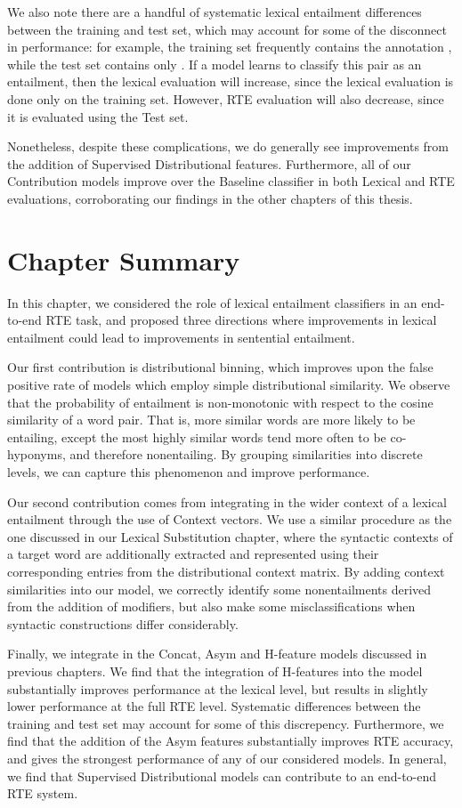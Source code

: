 We also note there are a handful of systematic lexical entailment differences
between the training and test set, which may account for some of the disconnect
in performance: for example, the training set frequently contains the
annotation , while the test set contains only
. If a model learns to classify this pair as an
entailment, then the lexical evaluation will increase, since the lexical
evaluation is done only on the training set. However, RTE evaluation will also
decrease, since it is evaluated using the Test set.

Nonetheless, despite these complications, we do generally see improvements from
the addition of Supervised Distributional features. Furthermore, all of our
Contribution models improve over the Baseline classifier in both Lexical and
RTE evaluations, corroborating our findings in the other chapters of this
thesis.


\section{Chapter Summary}

In this chapter, we considered the role of lexical entailment classifiers in
an end-to-end RTE task, and proposed three directions where improvements in
lexical entailment could lead to improvements in sentential entailment.

Our first contribution is distributional binning, which improves upon the false
positive rate of models which employ simple distributional similarity. We observe
that the probability of entailment is non-monotonic with respect to the cosine
similarity of a word pair. That is, more similar words are more likely
to be entailing, except the most highly similar words tend more often to
be co-hyponyms, and therefore nonentailing. By grouping similarities into
discrete levels, we can capture this phenomenon and improve performance.

Our second contribution comes from integrating in the wider context of a
lexical entailment through the use of Context vectors. We use a similar
procedure as the one discussed in our Lexical Substitution chapter, where the
syntactic contexts of a target word are additionally extracted and represented
using their corresponding entries from the distributional context matrix.
By adding context similarities into our model, we correctly identify some
nonentailments derived from the addition of modifiers, but also make some
misclassifications when syntactic constructions differ considerably.

Finally, we integrate in the Concat, Asym and H-feature models discussed in
previous chapters. We find that the integration of H-features into the model
substantially improves performance at the lexical level, but results in
slightly lower performance at the full RTE level. Systematic differences
between the training and test set may account for some of this discrepency.
Furthermore, we find that the addition of the Asym features substantially
improves RTE accuracy, and gives the strongest performance of any of our
considered models. In general, we find that Supervised Distributional models
can contribute to an end-to-end RTE system.

